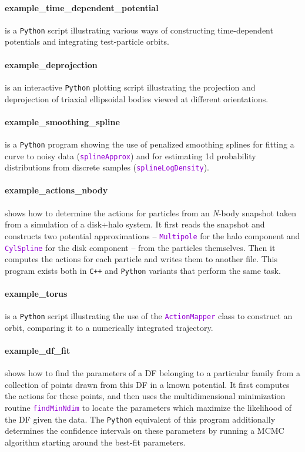 \documentclass[12pt]{article}
\newcommand{\Nbody}{\textsl{N}-body\xspace}
\newcommand{\Cpp}  {\texttt{C++}\xspace}
\newcommand{\Python}{\texttt{Python}\xspace}
\newcommand{\ttt}[1]{\textcolor{darkviolet}{\texttt{#1}}}
\begin{document}
\paragraph{example_time_dependent_potential} is a \Python script illustrating various ways of constructing time-dependent potentials and integrating test-particle orbits.

\paragraph{example_deprojection} is an interactive \Python plotting script illustrating the projection and deprojection of triaxial ellipsoidal bodies viewed at different orientations.

\paragraph{example_smoothing_spline} is a \Python program showing the use of penalized smoothing splines for fitting a curve to noisy data (\ttt{splineApprox}) and for estimating 1d probability distributions from discrete samples (\ttt{splineLogDensity}).

\paragraph{example_actions_nbody} shows how to determine the actions for particles from an \Nbody snapshot taken from a simulation of a disk+halo system. It first reads the snapshot and constructs two potential approximations -- \ttt{Multipole} for the halo component and \ttt{CylSpline} for the disk component -- from the particles themselves. Then it computes the actions for each particle and writes them to another file. This program exists both in \Cpp and \Python variants that perform the same task.

\paragraph{example_torus} is a \Python script illustrating the use of the \ttt{ActionMapper} class to construct an orbit, comparing it to a numerically integrated trajectory.

\paragraph{example_df_fit} shows how to find the parameters of a DF belonging to a particular family from a collection of points drawn from this DF in a known potential. It first computes the actions for these points, and then uses the multidimensional minimization routine \ttt{findMinNdim} to locate the parameters which maximize the likelihood of the DF given the data.
The \Python equivalent of this program additionally determines the confidence intervals on these parameters by running a MCMC algorithm starting around the best-fit parameters.
\end{document}
